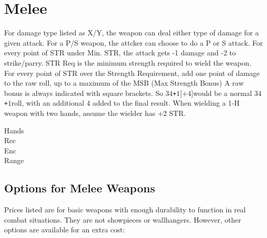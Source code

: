 \documentclass[twoside]{book}
\begin{document}
    

\section{Melee}
    
    {  
      For damage type listed as X/Y, the weapon can deal
             either type of damage for a given attack. For a P/S weapon,
             the attcker can choose to do a P or S attack. For every
             point of STR under Min. STR, the attack gets -1 damage and
             -2 to strike/parry. STR Req is the minimum strength required
             to wield the weapon. For every point of STR over the
             Strength Requirement, add one point of damage to the raw
             roll, up to a maximum of the MSB (Max Strength Bonus) A raw
             bonus is always indicated with square brackets. So \ensuremath{3}\ensuremath{4}\texttt{+}\ensuremath{1}\textscbf{}[\ensuremath{\texttt{+}\ensuremath{4}}]would be a normal \ensuremath{3}\ensuremath{4}\texttt{+}\ensuremath{1}roll, with an additional 4
             added to the final result. When wielding a 1-H weapon with
             two hands, assume the wielder has +2 STR. 
    }
  
\begin{description}
    
  \item[ Hands ] 
  \item[ Rec ] 
  \item[ Enc ] 
  \item[ Range ] 
\end{description}
  
    

\subsection{Options for Melee Weapons}
    
    {  
      Prices listed are for basic weapons with enough
               durability to function in real combat situations. They are
               not showpieces or wallhangers. However, other options are
               available for an extra cost: 
    }
  
\end{document}
